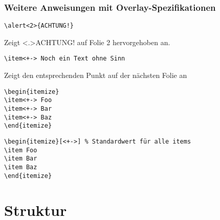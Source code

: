 \begin{slide}
  \frametitle{Weitere Anweisungen mit Overlay-Spezifikationen}

  \onslide<+->

  \begin{Beispiele}
\begin{lstlisting}
\alert<2>{ACHTUNG!}
\end{lstlisting}
    Zeigt \alert<.>{ACHTUNG!} auf Folie 2 hervorgehoben an.
    \onslide<+->
\begin{lstlisting}
\item<+-> Noch ein Text ohne Sinn
\end{lstlisting}
    Zeigt den entsprechenden Punkt auf der nächsten Folie an
    \begin{overprint}[\linewidth] %
\begin{lstlisting}
\begin{itemize}
\item<+-> Foo
\item<+-> Bar
\item<+-> Baz
\end{itemize}
\end{lstlisting}
\begin{lstlisting}
\begin{itemize}[<+->] % Standardwert für alle items
\item Foo
\item Bar
\item Baz
\end{itemize}
\end{lstlisting}
    \end{overprint}
  \end{Beispiele}

\end{slide}

\section{Struktur}

